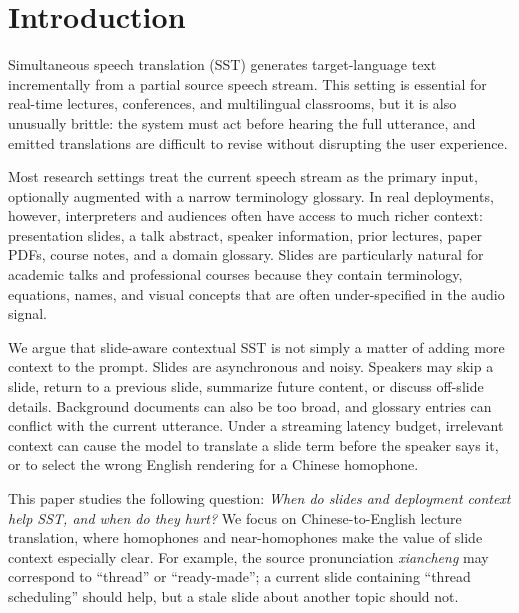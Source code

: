 \section{Introduction}

Simultaneous speech translation (SST) generates target-language text incrementally from a partial source speech stream.  This setting is essential for real-time lectures, conferences, and multilingual classrooms, but it is also unusually brittle: the system must act before hearing the full utterance, and emitted translations are difficult to revise without disrupting the user experience.

Most research settings treat the current speech stream as the primary input, optionally augmented with a narrow terminology glossary.  In real deployments, however, interpreters and audiences often have access to much richer context: presentation slides, a talk abstract, speaker information, prior lectures, paper PDFs, course notes, and a domain glossary.  Slides are particularly natural for academic talks and professional courses because they contain terminology, equations, names, and visual concepts that are often under-specified in the audio signal.

We argue that slide-aware contextual SST is not simply a matter of adding more context to the prompt.  Slides are asynchronous and noisy.  Speakers may skip a slide, return to a previous slide, summarize future content, or discuss off-slide details.  Background documents can also be too broad, and glossary entries can conflict with the current utterance.  Under a streaming latency budget, irrelevant context can cause the model to translate a slide term before the speaker says it, or to select the wrong English rendering for a Chinese homophone.

This paper studies the following question: \emph{When do slides and deployment context help SST, and when do they hurt?}  We focus on Chinese-to-English lecture translation, where homophones and near-homophones make the value of slide context especially clear.  For example, the source pronunciation \emph{xiancheng} may correspond to ``thread'' or ``ready-made''; a current slide containing ``thread scheduling'' should help, but a stale slide about another topic should not.

